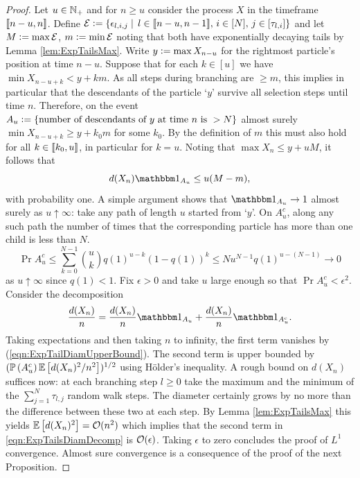 \begin{proof}
Let $u \in \N_+$ and for $n \geq u$ consider the process $X$ in the timeframe $\bbracket{n - u, n}$. Define $\cal{E} \defeq \{ \epsilon_{l, i, j} \mid\, l \in \bbracket{n - u,n - 1},\, i \in [N],\, j \in [\tau_{l,i}] \}$ and let $M \defeq \max \cal{E}$, $m \defeq \min \cal{E}$ noting that both have exponentially decaying tails by Lemma \ref{lem:ExpTailsMax}. Write $y \defeq \max X_{n - u}$ for the rightmost particle's position at time $n-u$. Suppose that for each $k \in [u]$ we have $\min X_{n - u + k} < y + k m$. As all steps during branching are $ \geq m$, this implies in particular that the descendants of the particle `$y$' survive all selection steps until time $n$. Therefore, on the event $A_u \defeq \{ \text{number of descendants of } y \text{ at time } n \text{ is } > N\}$ almost surely $\min X_{n - u + k} \geq y + k_0 m$ for some $k_0$. By the definition of $m$ this must also hold for all $k \in \bbracket{k_0, u}$, in particular for $k = u$. Noting that $\max X_n \leq y + u M$, it follows that 
\begin{equation}\label{eqn:ExpTailDiamUpperBound}
d(X_n)\Ind_{A_u} \leq u (M - m), 
\end{equation}
with probability one. A simple argument shows that $\Ind_{A_u} \to 1$ almost surely as $u \uparrow \infty$: take any path of length $u$ started from `$y$'. On $A_u^c$, along any such path the number of times that the corresponding particle has more than one child is less than $N$. 
\begin{equation}
\Pr{A^c_u} \leq \sum\limits_{k = 0}^{N - 1} {u \choose k} q(1)^{u - k} (1 - q(1))^k \leq N u^{N-1} q(1)^{u - (N - 1)} \to 0 
\end{equation}
as $u \uparrow \infty$ since $q(1) < 1$. Fix $\epsilon > 0$ and take $u$ large enough so that $\Pr{A_u^c} < \epsilon^2$. Consider the decomposition
\begin{equation}\label{eqn:ExpTailsDiamDecomp}
\frac{d(X_n)}{n} = \frac{d(X_n)}{n} \Ind_{A_u} + \frac{d(X_n)}{n} \Ind_{A_u^c}. 
\end{equation}
Taking expectations and then taking $n$ to infinity, the first term vanishes by (\ref{eqn:ExpTailDiamUpperBound}). The second term is upper bounded by $(\Pr{A_u^c} \Ex{d(X_n)^2 / n^2})^{1/2}$ using Hölder's inequality. A rough bound on $d(X_n)$ suffices now: at each branching step $l \geq 0$ take the maximum and the minimum of the $\sum_{j=1}^N \tau_{l, j}$ random walk steps. The diameter certainly grows by no more than the difference between these two at each step. By Lemma \ref{lem:ExpTailsMax} this yields $\Ex{d(X_n)^2} = \cal{O}(n^2)$ which implies that the second term in \ref{eqn:ExpTailsDiamDecomp} is $\cal{O}(\epsilon)$. Taking $\epsilon$ to zero concludes the proof of $L^1$ convergence. Almost sure convergence is a consequence of the proof of the next Proposition. 
\end{proof}

